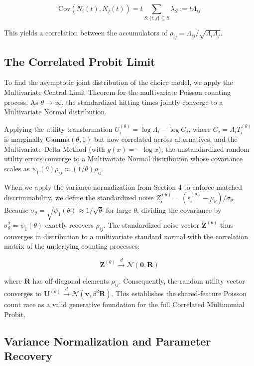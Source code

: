 \documentclass[
  man,
  floatsintext,
  longtable,
  a4paper,
  nolmodern,
  notxfonts,
  notimes,
  colorlinks=true,linkcolor=blue,citecolor=blue,urlcolor=blue]{apa7}
\begin{document}
\[\text{Cov}(N_i(t), N_j(t)) = t \sum_{S: \{i,j\} \subseteq S} \lambda_S := t \Lambda_{ij}\]

This yields a correlation between the accumulators of
\(\rho_{ij} = \Lambda_{ij} / \sqrt{\Lambda_i \Lambda_j}\).

\subsection{The Correlated Probit
Limit}\label{the-correlated-probit-limit}

To find the asymptotic joint distribution of the choice model, we apply
the Multivariate Central Limit Theorem for the multivariate Poisson
counting process. As \(\theta \to \infty\), the standardized hitting
times jointly converge to a Multivariate Normal distribution.

Applying the utility transformation
\(U_i^{(\theta)} = \log \Lambda_i - \log G_i\), where
\(G_i = \Lambda_i T_i^{(\theta)}\) is marginally
\(\text{Gamma}(\theta, 1)\) but now correlated across alternatives, and
the Multivariate Delta Method (with \(g(x) = -\log x\)), the
unstandardized random utility errors converge to a Multivariate Normal
distribution whose covariance scales as
\(\psi_1(\theta) \rho_{ij} \approx (1/\theta)\rho_{ij}\).

When we apply the variance normalization from Section 4 to enforce
matched discriminability, we define the standardized noise
\(Z_i^{(\theta)} = (\epsilon_i^{(\theta)} - \mu_\theta) / \sigma_\theta\).
Because
\(\sigma_\theta = \sqrt{\psi_1(\theta)} \approx 1/\sqrt{\theta}\) for
large \(\theta\), dividing the covariance by
\(\sigma_\theta^2 = \psi_1(\theta)\) exactly recovers \(\rho_{ij}\). The
standardized noise vector \(\mathbf{Z}^{(\theta)}\) thus converges in
distribution to a multivariate standard normal with the correlation
matrix of the underlying counting processes:

\[\mathbf{Z}^{(\theta)} \xrightarrow{d} \mathcal{N}(\mathbf{0}, \mathbf{R})\]

where \(\mathbf{R}\) has off-diagonal elements \(\rho_{ij}\).
Consequently, the random utility vector converges to
\(\mathbf{U}^{(\theta)} \xrightarrow{d} \mathcal{N}(\mathbf{v}, \beta^2 \mathbf{R})\).
This establishes the shared-feature Poisson count race as a valid
generative foundation for the full Correlated Multinomial Probit.

\subsection{Variance Normalization and Parameter
Recovery}\label{variance-normalization-and-parameter-recovery}
\end{document}
